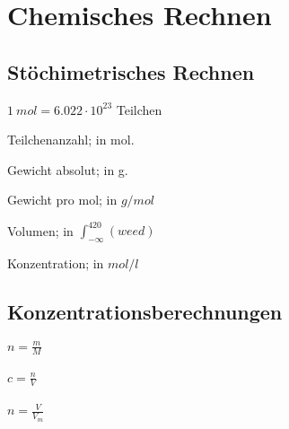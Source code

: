 \section{Chemisches Rechnen}

\subsection{Stöchimetrisches Rechnen}

\begin{definition}[mol]
	$1 \ mol = 6.022 \cdot 10^{23}$ Teilchen
\end{definition}

\begin{definition}[n]
	Teilchenanzahl; in mol.
\end{definition}

\begin{definition}[m]
	Gewicht absolut; in g.
\end{definition}

\begin{definition}[M]
	Gewicht pro mol; in $g/mol$
\end{definition}

\begin{definition}[V]

	Volumen; in	\LARGE $\int_{- \infty}^{420} (weed)$
\end{definition}

\begin{definition}[c]
	Konzentration; in $mol/l$
\end{definition}

\subsection{Konzentrationsberechnungen}

\large{
	$n=\frac{m}{M}$
	\\ \\
	$c=\frac{n}{V}$
	\\ \\
	$n = \frac{V}{V_m}$
}


